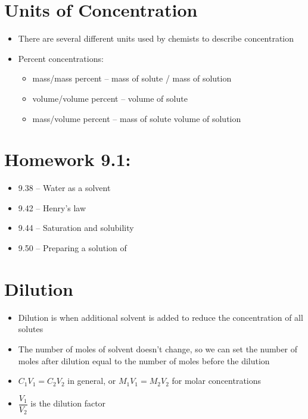 \documentclass[12pt, openany, letterpaper]{memoir}
\begin{document}
\section{Units of Concentration}
\begin{itemize}
	\item There are several different units used by chemists to describe concentration
	\item Percent concentrations:
	      \begin{itemize}
		      \item mass/mass percent -- mass of solute / mass of solution
		      \item volume/volume percent -- volume of solute
		      \item mass/volume percent -- mass of solute volume of solution
	      \end{itemize}
\end{itemize}

\section*{Homework 9.1:} %
\begin{itemize}
  \item 9.38 -- Water as a solvent
  \item 9.42 -- Henry's law
  \item 9.44 -- Saturation and solubility
  \item 9.50 -- Preparing a solution of 
\end{itemize}

\section{Dilution}
\begin{itemize}
	\item Dilution is when additional solvent is added to reduce the concentration of all solutes
	\item The number of moles of solvent doesn't change, so we can set the number of moles after dilution equal to the number of moles before the dilution
	\item $C_1V_1=C_2V_2$ in general, or $M_1V_1=M_2V_2$ for molar concentrations
	\item $\dfrac{V_1}{V_2}$ is the dilution factor
\end{itemize}
\end{document}
